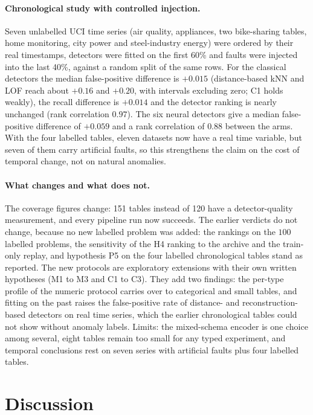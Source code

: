 \documentclass[conference]{IEEEtran}
\begin{document}
\paragraph{Chronological study with controlled injection.} Seven unlabelled UCI time series (air quality, appliances, two bike-sharing tables, home monitoring, city power and steel-industry energy) were ordered by their real timestamps, detectors were fitted on the first 60\% and faults were injected into the last 40\%, against a random split of the same rows. For the classical detectors the median false-positive difference is $+0.015$ (distance-based kNN and LOF reach about $+0.16$ and $+0.20$, with intervals excluding zero; C1 holds weakly), the recall difference is $+0.014$ and the detector ranking is nearly unchanged (rank correlation $0.97$). The six neural detectors give a median false-positive difference of $+0.059$ and a rank correlation of $0.88$ between the arms. With the four labelled tables, eleven datasets now have a real time variable, but seven of them carry artificial faults, so this strengthens the claim on the cost of temporal change, not on natural anomalies.

\paragraph{What changes and what does not.} The coverage figures change: 151 tables instead of 120 have a detector-quality measurement, and every pipeline run now succeeds. The earlier verdicts do not change, because no new labelled problem was added: the rankings on the $100$ labelled problems, the sensitivity of the H4 ranking to the archive and the train-only replay, and hypothesis P5 on the four labelled chronological tables stand as reported. The new protocols are exploratory extensions with their own written hypotheses (M1 to M3 and C1 to C3). They add two findings: the per-type profile of the numeric protocol carries over to categorical and small tables, and fitting on the past raises the false-positive rate of distance- and reconstruction-based detectors on real time series, which the earlier chronological tables could not show without anomaly labels. Limits: the mixed-schema encoder is one choice among several, eight tables remain too small for any typed experiment, and temporal conclusions rest on seven series with artificial faults plus four labelled tables.

\section{Discussion}
\label{sec:discussion}
\end{document}
